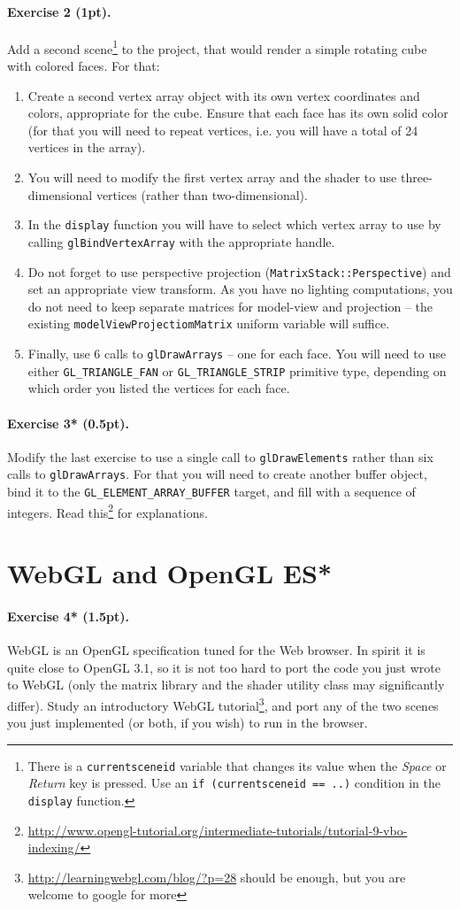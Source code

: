 \documentclass{article}
\newenvironment{exercise}[2]{\paragraph{Exercise #1 (#2pt).} }{
\medskip}
\begin{document}
\begin{exercise}{2}{1}
Add a second scene\footnote{There is a \texttt{current\textunderscore scene\textunderscore id} variable that changes its value when the \emph{Space} or \emph{Return} key is pressed. Use an \texttt{if (current\textunderscore scene\textunderscore id == ..)} condition in the \texttt{display} function.} to the project, that would render a simple rotating cube with colored faces. For that:
\begin{enumerate}
\item Create a second vertex array object with its own vertex coordinates and colors, appropriate for the cube. Ensure that each face has its own solid color (for that you will need to repeat vertices, i.e. you will have a total of 24 vertices in the array).
\item You will need to modify the first vertex array and the shader to use three-dimensional vertices (rather than two-dimensional).
\item In the \texttt{display} function you will have to select which vertex array to use by calling \texttt{glBindVertexArray} with the appropriate handle.
\item Do not forget to use perspective projection (\texttt{MatrixStack::Perspective}) and set an appropriate view transform. As you have no lighting computations, you do not need to keep separate matrices for model-view and projection -- the existing \texttt{modelViewProjectiomMatrix} uniform variable will suffice.
\item Finally, use 6 calls to \verb#glDrawArrays# -- one for each face. You will need to use either \verb#GL_TRIANGLE_FAN# or \verb#GL_TRIANGLE_STRIP# primitive type, depending on which order you listed the vertices for each face.
\end{enumerate}
\end{exercise}

\begin{exercise}{3*}{0.5}
Modify the last exercise to use a single call to \verb#glDrawElements# rather than six calls to \verb#glDrawArrays#. For that you will need to create another buffer object, bind it to the \verb#GL_ELEMENT_ARRAY_BUFFER# target, and fill with a sequence of integers. Read this\footnote{\url{http://www.opengl-tutorial.org/intermediate-tutorials/tutorial-9-vbo-indexing/}} for explanations.
\end{exercise}

\section{WebGL and OpenGL ES*}
\begin{exercise}{4*}{1.5}
WebGL is an OpenGL specification tuned for the Web browser. In spirit it is quite close to OpenGL 3.1, so it is not too hard to port the code you just wrote to WebGL (only the matrix library and the shader utility class may significantly differ). Study an introductory WebGL tutorial\footnote{\url{http://learningwebgl.com/blog/?p=28} should be enough, but you are welcome to google for more}, and port any of the two scenes you just implemented (or both, if you wish) to run in the browser.
\end{exercise}
\end{document}
